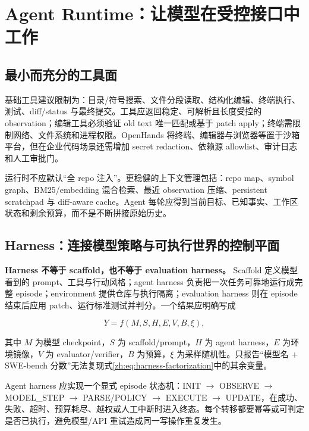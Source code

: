 \documentclass[10pt,a4paper,UTF8,fontset=none]{ctexart}
\newcommand{\ident}[1]{{\rmfamily #1}}
\begin{document}
\section{Agent Runtime：让模型在受控接口中工作}

\subsection{最小而充分的工具面}

基础工具建议限制为：目录/符号搜索、文件分段读取、结构化编辑、终端执行、测试、diff/status 与最终提交。工具应返回稳定、可解析且长度受控的 observation；编辑工具必须验证 old text 唯一匹配或基于 patch apply；终端需限制网络、文件系统和进程权限。OpenHands 将终端、编辑器与浏览器等置于沙箱平台\cite{zh:wang2024openhands}，但在企业代码场景还需增加 secret redaction、依赖源 allowlist、审计日志和人工审批门。

运行时不应默认“全 repo 注入”。更稳健的上下文管理包括：repo map、symbol graph、BM25/embedding 混合检索、最近 observation 压缩、persistent scratchpad 与 diff-aware cache。Agent 每轮应得到当前目标、已知事实、工作区状态和剩余预算，而不是不断拼接原始历史。

\subsection{Harness：连接模型策略与可执行世界的控制平面}

\textbf{Harness 不等于 scaffold，也不等于 evaluation harness。} Scaffold 定义模型看到的 prompt、工具与行动风格；agent harness 负责把一次任务可靠地运行成完整 episode；environment 提供仓库与执行隔离；evaluation harness 则在 episode 结束后应用 patch、运行标准测试并判分。一个结果应明确写成

\begin{equation}
Y=f(M,S,H,E,V,B,\xi),
\label{zh:eq:harness-factorization}
\end{equation}

其中 $M$ 为模型 checkpoint，$S$ 为 scaffold/prompt，$H$ 为 agent harness，$E$ 为环境镜像，$V$ 为 evaluator/verifier，$B$ 为预算，$\xi$ 为采样随机性。只报告“模型名 + SWE-bench 分数”无法复现式\eqref{zh:eq:harness-factorization}中的其余变量。

Agent harness 应实现一个显式 episode 状态机：\ident{INIT} $\rightarrow$ \ident{OBSERVE} $\rightarrow$ \ident{MODEL\_STEP} $\rightarrow$ \ident{PARSE/POLICY} $\rightarrow$ \ident{EXECUTE} $\rightarrow$ \ident{UPDATE}，在成功、失败、超时、预算耗尽、越权或人工中断时进入终态。每个转移都要幂等或可判定是否已执行，避免模型/API 重试造成同一写操作重复发生。
\end{document}
